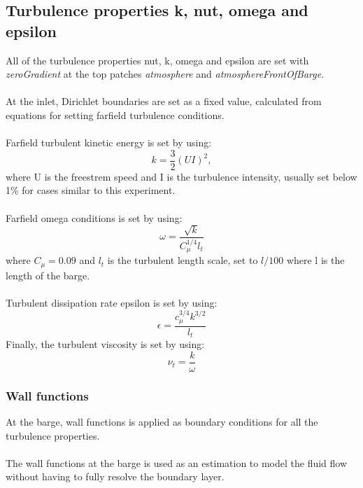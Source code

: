 \documentclass[a4paper, 12pt]{report}
\begin{document}
\subsection{Turbulence properties k, nut, omega and epsilon}
All of the turbulence properties nut, k, omega and epsilon are set with \textit{zeroGradient} at the top patches \textit{atmosphere} and \textit{atmosphereFrontOfBarge}.\\
\\
At the inlet, Dirichlet boundaries are set as a fixed value, calculated from equations for setting farfield turbulence conditions.\\
\\
Farfield turbulent kinetic energy is set by using:
\begin{equation}
k = \frac{3}{2}(UI)^2,
\label{eqn:turbulentKineticEnergy}
\end{equation}
where U is the freestrem speed and I is the turbulence intensity, usually set below 1\% for cases similar to this experiment. \\
\\
Farfield omega conditions is set by using:
\begin{equation}
\omega = \frac{\sqrt{k}}{C_{\mu}^{1/4}l_t}
\label{eqn:turbulentOmega}
\end{equation}
where $C_{\mu}=0.09$ and $l_t$ is the turbulent length scale, set to $l/100$ where l is the length of the barge.\\
\\
Turbulent dissipation rate epsilon is set by using:
\begin{equation}
\epsilon =  \frac{c_{\mu}^{3/4} k^{3/2}}{l_t}
\label{eqn:turbulentDissipationRate}
\end{equation}
Finally, the turbulent viscosity is set by using:
\begin{equation}
\nu_t = \frac{k}{\omega}
\label{eqn:turbulentViscosityFarfield}
\end{equation}
\subsubsection{Wall functions}
At the barge, wall functions is applied as boundary conditions for all the turbulence properties.\\
\\
The wall functions at the barge is used as an estimation to model the fluid flow without having to fully resolve the boundary layer. 
\end{document}
